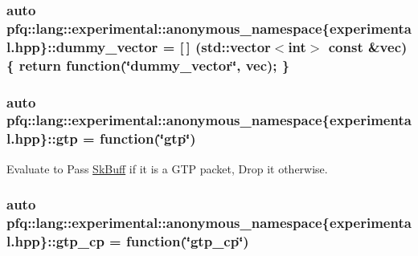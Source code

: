 \subsubsection[{\texorpdfstring{dummy\+\_\+vector}{dummy_vector}}]{\setlength{\rightskip}{0pt plus 5cm}auto pfq\+::lang\+::experimental\+::anonymous\+\_\+namespace\{experimental.\+hpp\}\+::dummy\+\_\+vector = \mbox{[}$\,$\mbox{]} (std\+::vector$<$int$>$ const \&vec) \{ return {\bf function}(\char`\"{}dummy\+\_\+vector\char`\"{}, vec); \}}\hypertarget{namespacepfq_1_1lang_1_1experimental_1_1anonymous__namespace_02experimental_8hpp_03_a8ee61246090fb5d74e96dbb7f19b7008}{}\label{namespacepfq_1_1lang_1_1experimental_1_1anonymous__namespace_02experimental_8hpp_03_a8ee61246090fb5d74e96dbb7f19b7008}
\subsubsection[{\texorpdfstring{gtp}{gtp}}]{\setlength{\rightskip}{0pt plus 5cm}auto pfq\+::lang\+::experimental\+::anonymous\+\_\+namespace\{experimental.\+hpp\}\+::gtp = {\bf function}(\char`\"{}gtp\char`\"{})}\hypertarget{namespacepfq_1_1lang_1_1experimental_1_1anonymous__namespace_02experimental_8hpp_03_abd26824e1b0e6a31ddbba793b727ef8f}{}\label{namespacepfq_1_1lang_1_1experimental_1_1anonymous__namespace_02experimental_8hpp_03_abd26824e1b0e6a31ddbba793b727ef8f}


Evaluate to {\ttfamily Pass} \hyperlink{structpfq_1_1lang_1_1SkBuff}{Sk\+Buff} if it is a G\+TP packet, {\ttfamily Drop} it otherwise. 

\subsubsection[{\texorpdfstring{gtp\+\_\+cp}{gtp_cp}}]{\setlength{\rightskip}{0pt plus 5cm}auto pfq\+::lang\+::experimental\+::anonymous\+\_\+namespace\{experimental.\+hpp\}\+::gtp\+\_\+cp = {\bf function}(\char`\"{}gtp\+\_\+cp\char`\"{})}\hypertarget{namespacepfq_1_1lang_1_1experimental_1_1anonymous__namespace_02experimental_8hpp_03_a209a0ce5245cb37a38e0e4c6616e3604}{}\label{namespacepfq_1_1lang_1_1experimental_1_1anonymous__namespace_02experimental_8hpp_03_a209a0ce5245cb37a38e0e4c6616e3604}


